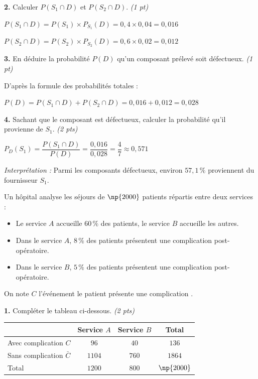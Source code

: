 \documentclass[11pt,a4paper]{article}
\newcommand{\sol}[1]{\textcolor{solcolor}{#1}}
\newcounter{numexos}
\newcommand{\bex}[2]{%
\def\bextitle{#1}%
\addtocounter{numexos}{1}%
\begin{tcolorbox}[
  enhanced,
  colback=white,colframe=exoheader,
  colbacktitle=exoheader,coltitle=white,
  fonttitle=\bfseries,
  title={Exercice~\thenumexos\ifx\bextitle\empty\else~--~~#1\fi},
  boxrule=0.8pt,arc=3pt,
  left=4mm,right=4mm,top=1mm,bottom=2mm]%
  #2%
\end{tcolorbox}}
\renewcommand{\arraystretch}{1.6}
\begin{document}
\textbf{2.} Calculer $P(S_1 \cap D)$ et $P(S_2 \cap D)$. \hfill\textit{(1 pt)}

\medskip
\sol{$P(S_1 \cap D) = P(S_1)\times P_{S_1}(D) = 0{,}4 \times 0{,}04 = 0{,}016$}

\sol{$P(S_2 \cap D) = P(S_2)\times P_{S_2}(D) = 0{,}6 \times 0{,}02 = 0{,}012$}

\vspace{4mm}

\textbf{3.} En déduire la probabilité $P(D)$ qu'un composant prélevé soit défectueux. \hfill\textit{(1 pt)}

\medskip
\sol{D'après la formule des probabilités totales :}

\sol{$P(D) = P(S_1 \cap D) + P(S_2 \cap D) = 0{,}016 + 0{,}012 = 0{,}028$}

\vspace{4mm}

\textbf{4.} Sachant que le composant est défectueux, calculer la probabilité qu'il provienne de $S_1$. \hfill\textit{(2 pts)}

\medskip
\sol{$P_D(S_1) = \dfrac{P(S_1 \cap D)}{P(D)} = \dfrac{0{,}016}{0{,}028} = \dfrac{4}{7} \approx 0{,}571$}

\smallskip
\sol{\textit{Interprétation :} Parmi les composants défectueux, environ $57{,}1\,\%$ proviennent du fournisseur $S_1$.}

\newpage

\bex{Tableau de probabilités \hfill \textit{6 points}}{%
\smallskip
Un hôpital analyse les séjours de $\np{2000}$ patients répartis entre deux services :
\begin{itemize}
  \item Le service $A$ accueille $60\,\%$ des patients, le service $B$ accueille les autres.
  \item Dans le service $A$, $8\,\%$ des patients présentent une complication post-opératoire.
  \item Dans le service $B$, $5\,\%$ des patients présentent une complication post-opératoire.
\end{itemize}
On note $C$ l'événement \og le patient présente une complication \fg.
}

\textbf{1.} Compléter le tableau ci-dessous. \hfill\textit{(2 pts)}

\begin{center}
\renewcommand{\arraystretch}{2.2}
\begin{tabular}{|L{5cm}|c|c|c|}
\hline
{} & Service $A$ & Service $B$ & Total \\
\hline
Avec complication $C$    & \sol{$96$}   & \sol{$40$}  & \sol{$136$} \\
\hline
Sans complication $\bar{C}$ & \sol{$1104$} & \sol{$760$} & \sol{$1864$} \\
\hline
Total & \sol{$1200$} & \sol{$800$} & $\np{2000}$ \\
\hline
\end{tabular}
\end{center}
\end{document}
